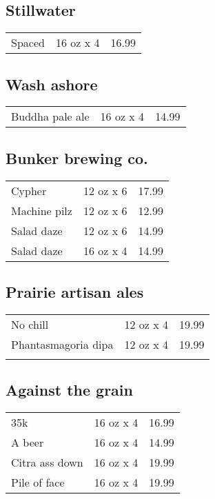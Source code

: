 \documentclass{article}%
\begin{document}
\begin{multicols}{3}
%
\subsection*{Stillwater}%
\begin{tabular}{l c r}%
Spaced&16 oz x 4&16.99\\%
\end{tabular}

%
\subsection*{Wash ashore}%
\begin{tabular}{l c r}%
Buddha pale ale&16 oz x 4&14.99\\%
\end{tabular}

%
\subsection*{Bunker brewing co.}%
\begin{tabular}{l c r}%
Cypher&12 oz x 6&17.99\\%
Machine pilz&12 oz x 6&12.99\\%
Salad daze&12 oz x 6&14.99\\%
Salad daze&16 oz x 4&14.99\\%
\end{tabular}

%
\subsection*{Prairie artisan ales}%
\begin{tabular}{l c r}%
No chill&12 oz x 4&19.99\\%
\multirow{1}{15ex}{Phantasmagoria dipa}&12 oz x 4&19.99\\%
&&\\%
\end{tabular}

%
\subsection*{Against the grain}%
\begin{tabular}{l c r}%
35k&16 oz x 4&16.99\\%
A beer&16 oz x 4&14.99\\%
Citra ass down&16 oz x 4&19.99\\%
Pile of face&16 oz x 4&19.99\\%
\end{tabular}


\end{multicols}
\end{document}
